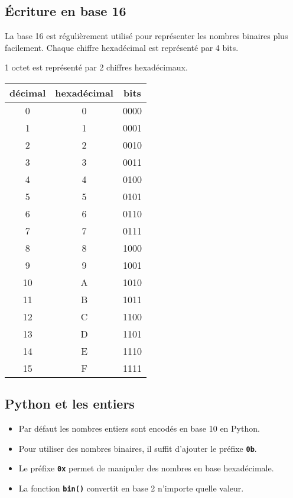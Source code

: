 \documentclass[a4paper,11pt]{article}
\begin{document}
\subsection{Écriture en base 16}
La base 16 est régulièrement utilisé pour représenter les nombres binaires plus facilement. Chaque chiffre hexadécimal est représenté par 4 bits.
\begin{aretenir}[]
    1 octet est représenté par 2 chiffres hexadécimaux.
\end{aretenir}
\begin{center}
\begin{tabular}{|c|c|c|}
    \hline
    décimal & hexadécimal & bits \\
    \hline
    0       & 0           & 0000 \\
    \hline
    1       & 1           & 0001 \\
    \hline
    2       & 2           & 0010 \\
    \hline
    3       & 3           & 0011 \\
    \hline
    4       & 4           & 0100 \\
    \hline
    5       & 5           & 0101 \\
    \hline
    6       & 6           & 0110 \\
    \hline
    7       & 7           & 0111 \\
    \hline
    8       & 8           & 1000 \\
    \hline
    9       & 9           & 1001 \\
    \hline
    10      & A           & 1010 \\
    \hline
    11      & B           & 1011 \\
    \hline
    12      & C           & 1100 \\
    \hline
    13      & D           & 1101 \\
    \hline
    14      & E           & 1110 \\
    \hline
    15      & F           & 1111 \\
    \hline
\end{tabular}
\end{center}
\subsection{Python et les entiers}
\begin{itemize}
    \item Par défaut les nombres entiers sont encodés en base 10 en Python.
    \item Pour utiliser des nombres binaires, il suffit d'ajouter le préfixe \texttt{\textbf{0b}}.
    \item Le préfixe \texttt{\textbf{0x}} permet de manipuler des nombres en base hexadécimale.
    \item La fonction \texttt{\textbf{bin()}} convertit en base 2 n'importe quelle valeur.
\end{itemize}
\end{document}
